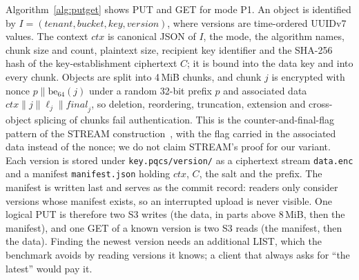 \documentclass[conference]{IEEEtran}
\begin{document}
Algorithm~\ref{alg:putget} shows PUT and GET for mode P1. An object is identified by
$I=(\mathit{tenant},\mathit{bucket},\mathit{key},\mathit{version})$, where versions are
time-ordered UUIDv7 values. The context $\mathit{ctx}$ is canonical JSON of $I$, the mode, the
algorithm names, chunk size and count, plaintext size, recipient key identifier and the SHA-256
hash of the key-establishment ciphertext $C$; it is bound into the data key and into every chunk.
Objects are split into 4\,MiB chunks, and chunk $j$ is encrypted with nonce
$p\|\mathrm{be}_{64}(j)$ under a random 32-bit prefix $p$ and associated data
$\mathit{ctx}\|j\|\ell_j\|\mathit{final}_j$, so deletion, reordering, truncation, extension and
cross-object splicing of chunks fail authentication. This is the counter-and-final-flag pattern
of the STREAM construction~\cite{hoang2015}, with the flag carried in the associated data
instead of the nonce; we do not claim STREAM's proof for our variant. Each version is stored under
\texttt{key.pqcs/version/} as a ciphertext stream \texttt{data.enc} and a manifest
\texttt{manifest.json} holding $\mathit{ctx}$, $C$, the salt and the prefix. The manifest is
written last and serves as the commit record: readers only consider versions whose manifest
exists, so an interrupted upload is never visible. One logical PUT is therefore two S3 writes
(the data, in parts above 8\,MiB, then the manifest), and one GET of a known version is two S3
reads (the manifest, then the data). Finding the newest version needs an additional LIST, which
the benchmark avoids by reading versions it knows; a client that always asks for ``the latest''
would pay it.
\end{document}
